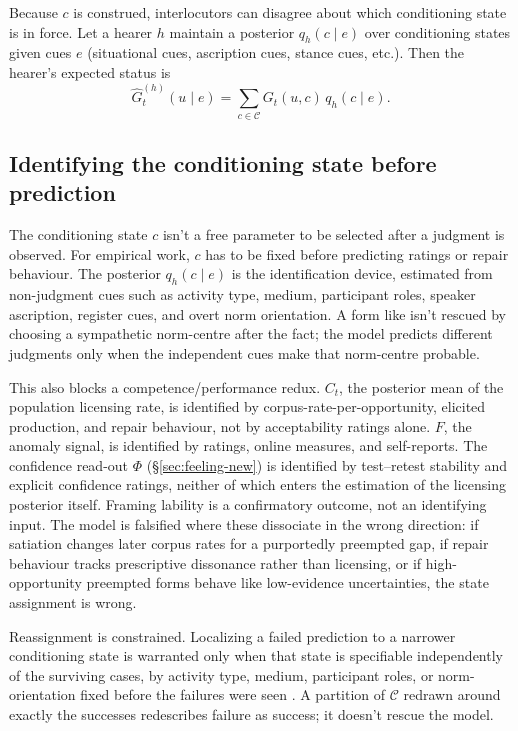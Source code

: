 Because $c$ is construed, interlocutors can disagree about which conditioning state is in force. Let a hearer $h$ maintain a posterior $q_h(c\mid e)$ over conditioning states given cues $e$ (situational cues, ascription cues, stance cues, etc.). Then the hearer's expected status is
\begin{equation*}
\hat{G}^{(h)}_{t}(u\mid e)=\sum_{c\in\mathcal{C}} G_t(u,c)\,q_h(c\mid e).
\end{equation*}

\subsection{Identifying the conditioning state before prediction}
\label{sec:identification-c}

The conditioning state $c$ isn't a free parameter to be selected after a judgment is observed. For empirical work, $c$ has to be fixed before predicting ratings or repair behaviour. The posterior $q_h(c\mid e)$ is the identification device, estimated from non-judgment cues such as activity type, medium, participant roles, speaker ascription, register cues, and overt norm orientation. A form like  isn't rescued by choosing a sympathetic norm-centre after the fact; the model predicts different judgments only when the independent cues make that norm-centre probable.

This also blocks a competence/performance redux. $C_t$, the posterior mean of
the population licensing rate, is identified by corpus-rate-per-opportunity,
elicited production, and repair behaviour, not by acceptability ratings alone.
$F$, the anomaly signal, is identified by ratings, online measures, and
self-reports. The confidence read-out $\Phi$ (\S\ref{sec:feeling-new}) is
identified by test--retest stability and explicit confidence ratings, neither of
which enters the estimation of the licensing posterior itself. Framing lability
is a confirmatory outcome, not an identifying input. The model is falsified
where these dissociate in the wrong direction: if satiation changes later corpus
rates for a purportedly preempted gap, if repair behaviour tracks prescriptive
dissonance rather than licensing, or if high-opportunity preempted forms behave
like low-evidence uncertainties, the state assignment is wrong.

Reassignment is constrained. Localizing a failed prediction to a narrower
conditioning state is warranted only when that state is specifiable independently
of the surviving cases, by activity type, medium, participant roles, or
norm-orientation fixed before the failures were seen
\autocite{reynolds2026kindsProjectibilityProfiles}. A partition of
$\mathcal{C}$ redrawn around exactly the successes redescribes failure as
success; it doesn't rescue the model.


